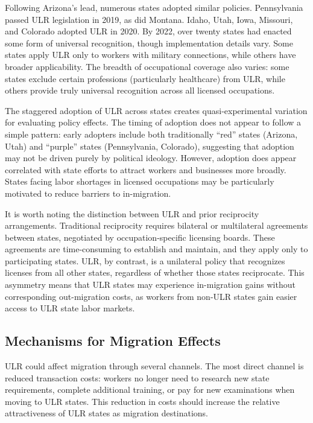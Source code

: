 \documentclass[12pt]{article}
\begin{document}
Following Arizona's lead, numerous states adopted similar policies. Pennsylvania passed ULR legislation in 2019, as did Montana. Idaho, Utah, Iowa, Missouri, and Colorado adopted ULR in 2020. By 2022, over twenty states had enacted some form of universal recognition, though implementation details vary. Some states apply ULR only to workers with military connections, while others have broader applicability. The breadth of occupational coverage also varies: some states exclude certain professions (particularly healthcare) from ULR, while others provide truly universal recognition across all licensed occupations.

The staggered adoption of ULR across states creates quasi-experimental variation for evaluating policy effects. The timing of adoption does not appear to follow a simple pattern: early adopters include both traditionally ``red'' states (Arizona, Utah) and ``purple'' states (Pennsylvania, Colorado), suggesting that adoption may not be driven purely by political ideology. However, adoption does appear correlated with state efforts to attract workers and businesses more broadly. States facing labor shortages in licensed occupations may be particularly motivated to reduce barriers to in-migration.

It is worth noting the distinction between ULR and prior reciprocity arrangements. Traditional reciprocity requires bilateral or multilateral agreements between states, negotiated by occupation-specific licensing boards. These agreements are time-consuming to establish and maintain, and they apply only to participating states. ULR, by contrast, is a unilateral policy that recognizes licenses from all other states, regardless of whether those states reciprocate. This asymmetry means that ULR states may experience in-migration gains without corresponding out-migration costs, as workers from non-ULR states gain easier access to ULR state labor markets.

\subsection{Mechanisms for Migration Effects}

ULR could affect migration through several channels. The most direct channel is reduced transaction costs: workers no longer need to research new state requirements, complete additional training, or pay for new examinations when moving to ULR states. This reduction in costs should increase the relative attractiveness of ULR states as migration destinations.
\end{document}
